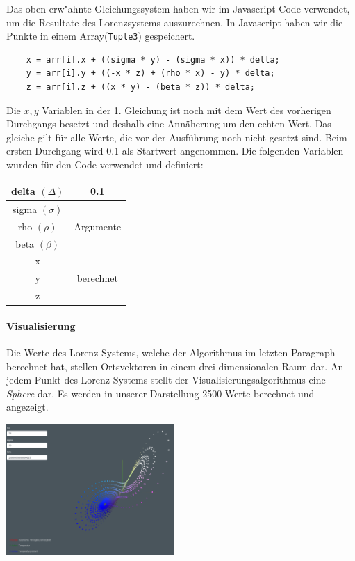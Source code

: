 \documentclass[implementation]{subfiles}
\begin{document}
Das oben erw"ahnte Gleichungssystem haben wir im Javascript-Code verwendet, um die Resultate des Lorenzsystems auszurechnen. In Javascript haben wir die Punkte in einem Array(\texttt{Tuple3}) gespeichert.

\begin{centerFigure}
	\begin{lstlisting}
	x = arr[i].x + ((sigma * y) - (sigma * x)) * delta;
	y = arr[i].y + ((-x * z) + (rho * x) - y) * delta;
	z = arr[i].z + ((x * y) - (beta * z)) * delta;
	\end{lstlisting}
\end{centerFigure}

Die $ x, y $ Variablen in der 1. Gleichung ist noch mit dem Wert des vorherigen Durchgangs besetzt und deshalb eine Annäherung um den echten Wert. Das gleiche gilt für alle Werte, die vor der Ausführung noch nicht gesetzt sind. Beim ersten Durchgang wird 0.1 als Startwert angenommen. Die folgenden Variablen wurden für den Code verwendet und definiert:

	\begin{centerFigure}
		\begin{tabular}{| c | c |}
			\hline
			delta $ (\Delta) $ & 0.1 \\\hline
			sigma $ (\sigma) $ & \multirow{3}{*}{Argumente}\\
			rho $(\rho) $ & \\
			beta $ (\beta) $ & \\\hline
			x & \multirow{3}{*}{berechnet}\\
			y & \\
			z & \\\hline
		\end{tabular}
	\end{centerFigure}
	
	\paragraph{Visualisierung}
	Die Werte des Lorenz-Systems, welche der Algorithmus im letzten Paragraph berechnet hat, stellen Ortsvektoren in einem drei dimensionalen Raum dar. An jedem Punkt des Lorenz-Systems stellt der Visualisierungsalgorithmus eine \textit{Sphere} dar. Es werden in unserer Darstellung 2500 Werte berechnet und angezeigt.
	
	\begin{centerFigure}
		\includegraphics[height=5cm]{lorenz/assets/implementation/Visualisierung}
	\end{centerFigure}
\end{document}
